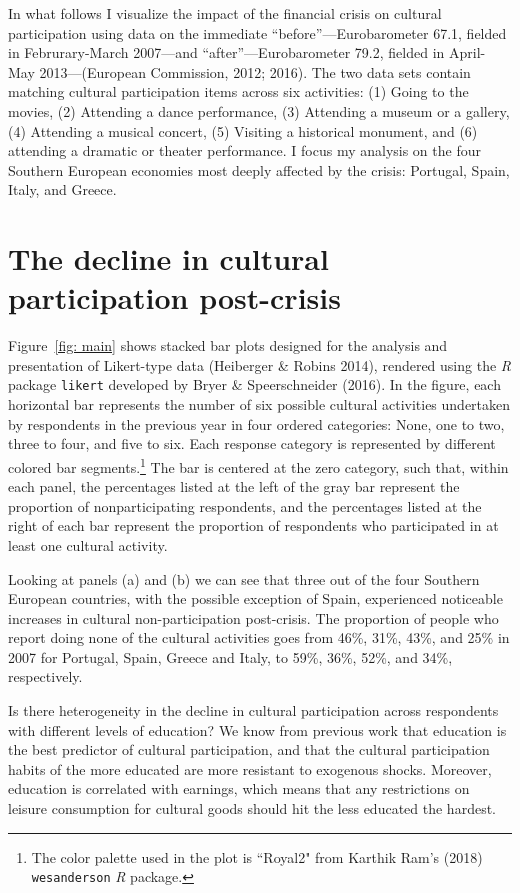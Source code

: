 \documentclass{article}
\begin{document}
In what follows I visualize the impact of the financial crisis on cultural participation using data on the immediate ``before''---Eurobarometer 67.1, fielded in Februrary-March 2007---and ``after''---Eurobarometer 79.2, fielded in April-May 2013---(European Commission, 2012; 2016). The two data sets contain matching cultural participation items across six activities: (1) Going to the movies, (2) Attending a dance performance, (3) Attending a museum or a gallery, (4) Attending a musical concert, (5) Visiting a historical monument, and (6) attending a dramatic or theater performance. I focus my analysis on the four Southern European economies most deeply affected by the crisis: Portugal, Spain, Italy, and Greece. 

\section{The decline in cultural participation post-crisis}
Figure~\ref{fig: main} shows stacked bar plots designed for the analysis and presentation of Likert-type data (Heiberger \& Robins 2014), rendered using the {\em} {\em R} package \texttt{likert} developed by Bryer \& Speerschneider (2016). In the figure, each horizontal bar represents the number of six possible cultural activities undertaken by respondents in the previous year in four ordered categories: None, one to two, three to four, and five to six. Each response category is represented by different colored bar segments.\footnote{The color palette used in the plot is ``Royal2" from Karthik Ram's (2018) \texttt{wesanderson} {\em R} package.} The bar is centered at the zero category, such that, within each panel, the percentages listed at the left of the gray bar represent the proportion of nonparticipating respondents, and the percentages listed at the right of each bar represent the proportion of respondents who participated in at least one cultural activity. 

Looking at panels (a) and (b) we can see that three out of the four Southern European countries, with the possible exception of Spain, experienced noticeable increases in cultural non-participation post-crisis. The proportion of people who report doing none of the cultural activities goes from 46\%, 31\%, 43\%, and 25\% in 2007 for Portugal, Spain, Greece and Italy, to 59\%, 36\%, 52\%, and 34\%, respectively. 

Is there heterogeneity in the decline in cultural participation across respondents with different levels of education? We know from previous work that education is the best predictor of cultural participation, and that the cultural participation habits of the more educated are more resistant to exogenous shocks. Moreover, education is correlated with earnings, which means that any restrictions on leisure consumption for cultural goods should hit the less educated the hardest. 
\end{document}
